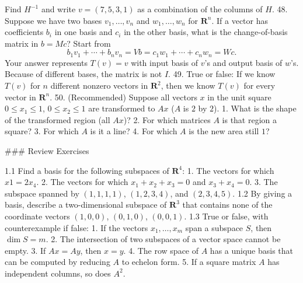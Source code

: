 Find \(H^{-1}\) and write \(v=(7,5,3,1)\) as a combination of the columns of \(H\).
48. Suppose we have two bases \(v_{1},\ldots,v_{n}\) and \(w_{1},\ldots,w_{n}\) for \(\mathbf{R}^{n}\). If a vector has coefficients \(b_{i}\) in one basis and \(c_{i}\) in the other basis, what is the change-of-basis matrix in \(b=Mc\)? Start from \[b_{1}v_{1}+\cdots+b_{n}v_{n}=Vb=c_{1}w_{1}+\cdots+c_{n}w_{n}=Wc.\] Your answer represents \(T(v)=v\) with input basis of \(v\)'s and output basis of \(w\)'s. Because of different bases, the matrix is not \(I\).
49. True or false: If we know \(T(v)\) for \(n\) different nonzero vectors in \(\mathbf{R}^{2}\), then we know \(T(v)\) for every vector in \(\mathbf{R}^{n}\).
50. (Recommended) Suppose all vectors \(x\) in the unit square \(0\leq x_{1}\leq 1\), \(0\leq x_{2}\leq 1\) are transformed to \(Ax\) (\(A\) is \(2\) by \(2\)). 1. What is the shape of the transformed region (all \(Ax\))? 2. For which matrices \(A\) is that region a square? 3. For which \(A\) is it a line? 4. For which \(A\) is the new area still \(1\)?

### Review Exercises

1.1 Find a basis for the following subspaces of \(\mathbf{R}^{4}\): 1. The vectors for which \(x1=2x_{4}\). 2. The vectors for which \(x_{1}+x_{2}+x_{3}=0\) and \(x_{3}+x_{4}=0\). 3. The subspace spanned by \((1,1,1,1)\), \((1,2,3,4)\), and \((2,3,4,5)\).
1.2 By giving a basis, describe a two-dimensional subspace of \(\mathbf{R}^{3}\) that contains none of the coordinate vectors \((1,0,0)\), \((0,1,0)\), \((0,0,1)\).
1.3 True or false, with counterexample if false: 1. If the vectors \(x_{1},\ldots,x_{m}\) span a subspace \(S\), then \(\dim S=m\). 2. The intersection of two subspaces of a vector space cannot be empty. 3. If \(Ax=Ay\), then \(x=y\). 4. The row space of \(A\) has a unique basis that can be computed by reducing \(A\) to echelon form. 5. If a square matrix \(A\) has independent columns, so does \(A^{2}\).

 